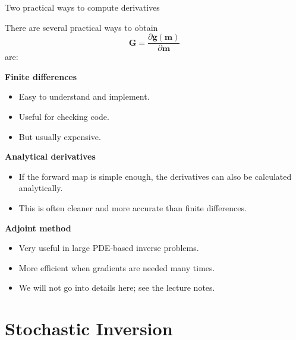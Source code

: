 \documentclass[aspectratio=169]{beamer}
\newcommand{\mat}[1]{{\mathbf{#1}}}
\renewcommand{\vec}[1]{\mathbf{#1}}
\newcommand{\mm}{ {\vec{m}} }
\renewcommand{\gg}[1]{\vec{g}\left(#1\right)}
\newcommand{\GG}{\mat{G}}
\begin{document}


\begin{frame}{Two practical ways to compute derivatives}
\small

There are several practical ways to obtain
\[
\GG=\frac{\partial \gg{\mm}}{\partial \mm}
\]
are:

{
\vspace{0.15cm}
\textbf{Finite differences}

\begin{itemize}
    \item[--] Easy to understand and implement.
    \item[--] Useful for checking code.
    \item[--] But usually expensive.
\end{itemize}

\vspace{0.1cm}
\textbf{Analytical derivatives}
\begin{itemize}
    \item[--] If the forward map is simple enough, the derivatives can also be calculated analytically.
    \item[--] This is often cleaner and more accurate than finite differences.
\end{itemize}

\vspace{0.1cm}
\textbf{Adjoint method}
\begin{itemize}
    \item[--] Very useful in large PDE-based inverse problems.
    \item[--] More efficient when gradients are needed many times.
    \item[--] We will not go into details here; see the lecture notes.
\end{itemize}
}
\end{frame}

\section{Stochastic Inversion}
\end{document}
